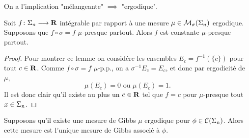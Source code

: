   \begin{remark}
    On a l'implication "mélangeante" $\implies$ "ergodique".
  \end{remark}

  \begin{lemma}
    \label{lem:sig_inv_imp_cst}
    Soit $f \colon \Sigma_n \longrightarrow \mathbf R$ intégrable par rapport à une mesure $\mu \in \mathcal{M}_{\sigma}(\Sigma_{n})$ ergodique.
    Supposons que $f \circ \sigma = f$ $\mu$-presque partout.
    Alors $f$ est constante $\mu$-presque partout.
  \end{lemma}

  \begin{proof}
    Pour montrer ce lemme on considére les ensembles $E_c = f^{-1}(\{c\})$ pour tout $c\in\mathbf R$.
    Comme $f \circ \sigma = f$ $\mu$-p.p., on a $\sigma^{-1}E_c = E_c$, et donc par ergodicité de $\mu$,
    $$\mu(E_c) = 0 \text{ ou } \mu(E_c) = 1.$$
    Il est donc clair qu'il existe au plus un $c\in\mathbf R$ tel que $f = c$ pour $\mu$-presque tout $x \in \Sigma_n$.
  \end{proof}

  \begin{proposition}
    \label{prop:unique}
    Supposons qu'il existe une mesure de Gibbs $\mu$ ergodique pour $\phi \in \mathcal{C} (\Sigma_{n})$.
    Alors cette mesure est l'unique mesure de Gibbs associé à $\phi$.
  \end{proposition}


